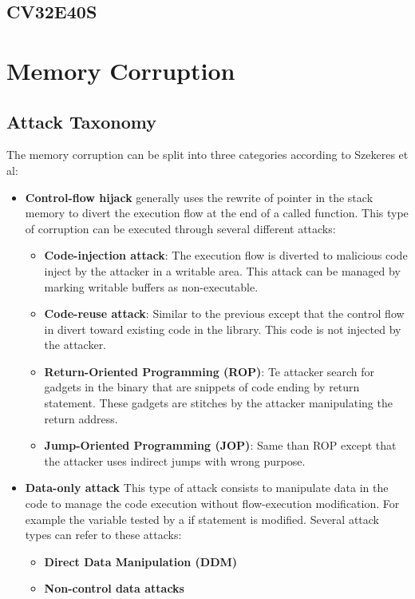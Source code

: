 \documentclass{book}
\begin{document}
		\section{CV32E40S}
		
		
	\chapter{Memory Corruption}
	
		\section{Attack Taxonomy} 
			The memory corruption can be split into three categories according to Szekeres et al:
			\begin{itemize}
				\item \textbf{Control-flow hijack} generally uses the rewrite of pointer in the stack memory to divert the execution flow at the end of a called function. This type of corruption can be executed through several different attacks:
				\begin{itemize}
					\item \textbf{Code-injection attack}: The execution flow is diverted to malicious code inject by the attacker in a writable area. This attack can be managed by marking writable buffers as non-executable.
					\item \textbf{Code-reuse attack}: Similar to the previous except that the control flow in divert toward existing code in the library. This code is not injected by the attacker.
					\item \textbf{Return-Oriented Programming (ROP)}: Te attacker search for gadgets in the binary that are snippets of code ending by return statement. These gadgets are stitches by the attacker manipulating the return address.
					\item \textbf{Jump-Oriented Programming (JOP)}: Same than ROP except that the attacker uses indirect jumps with wrong purpose.
				\end{itemize} 
				\item \textbf{Data-only attack} This type of attack consists to manipulate data in the code to manage the code execution without flow-execution modification. For example the variable tested by a if statement is modified. Several attack types can refer to these attacks:
				\begin{itemize}
					\item \textbf{Direct Data Manipulation (DDM)}
					\item \textbf{Non-control data attacks}

\end{itemize}
\end{itemize}
\end{document}
